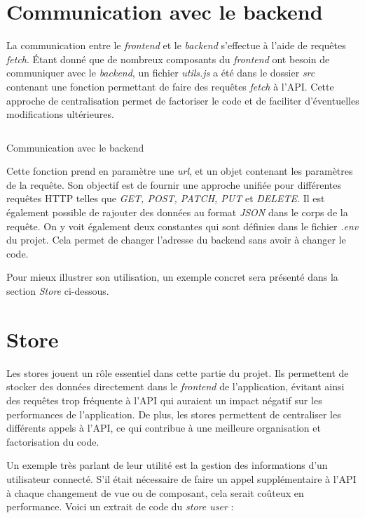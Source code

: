 \section{Communication avec le backend}
La communication entre le \emph{frontend} et le \emph{backend} s'effectue à l'aide de requêtes \emph{fetch}. Étant donné que de nombreux composants du \emph{frontend} ont besoin de communiquer avec le \emph{backend}, un fichier \emph{utils.js} a été dans le dossier \emph{src} contenant une fonction permettant de faire des requêtes \emph{fetch} à l'API. Cette approche de centralisation permet de factoriser le code et de faciliter d'éventuelles modifications ultérieures.


\begin{listing}[H]
    \inputminted{js}{assets/code/communcation.vue}
    \caption{Communication avec le backend}
\end{listing}

Cette fonction prend en paramètre une \emph{url}, et un objet contenant les paramètres de la requête. Son objectif est de fournir une approche unifiée pour différentes requêtes HTTP telles que \emph{GET, POST, PATCH, PUT} et \emph{DELETE}. Il est également possible de rajouter des données au format \emph{JSON} dans le corps de la requête. On y voit également deux constantes qui sont définies dans le fichier \emph{.env} du projet. Cela permet de changer l'adresse du backend sans avoir à changer le code.

Pour mieux illustrer son utilisation, un exemple concret sera présenté dans la section \emph{Store} ci-dessous.

\section{Store}
Les stores jouent un rôle essentiel dans cette partie du projet. Ils permettent de stocker des données directement dans le \emph{frontend} de l'application, évitant ainsi des requêtes trop fréquente à l'API qui auraient un impact négatif sur les performances de l'application. De plus, les stores permettent de centraliser les différents appels à l'API, ce qui contribue à une meilleure organisation et factorisation du code.

Un exemple très parlant de leur utilité est la gestion des informations d'un utilisateur connecté. S'il était nécessaire de faire un appel supplémentaire à l'API à chaque changement de vue ou de composant, cela serait coûteux en performance.
Voici un extrait de code du \emph{store user} :

